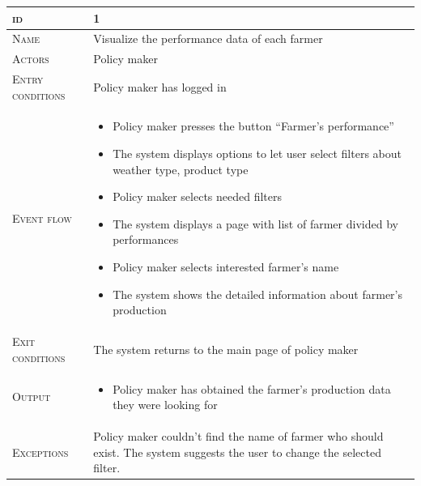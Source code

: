 

\begin{table}[H]
    \centering
    \begin{tabular}{|l|p{}|}
        \hline %
    	\textsc{id}                 &   1\\
    	\hline %
    	\textsc{Name}               &   Visualize the performance data of each farmer\\
    	\hline %
    	\textsc{Actors}             &   Policy maker\\
    	\hline %
    	\textsc{Entry conditions}   &   Policy maker has logged in\\
    	\hline %
    	\textsc{Event flow}         &   %
            	                        \begin{itemize}
                                    	    \item Policy maker presses the button “Farmer’s performance”
                                    	    \item The system displays options to let user select filters about weather type, product type
                                    		\item Policy maker selects needed filters
                                    		\item The system displays a page with list of farmer divided by performances
                                    		\item Policy maker selects interested farmer’s name
                                    		\item The system shows the detailed information about farmer’s production
                                        \end{itemize}\\
        \hline %
        \textsc{Exit conditions}    &  The system returns to the main page of policy maker\\
    	\hline %
    	\textsc{Output}             &  \begin{itemize}
    	    \item Policy maker has obtained the farmer's production data they were looking for
    	\end{itemize}\\
    	\hline %
    	\textsc{Exceptions}         &  Policy maker couldn’t find the name of farmer who should exist. The system suggests the user to change the selected filter.\\
    	\hline %
        

\end{tabular}
\end{table}
